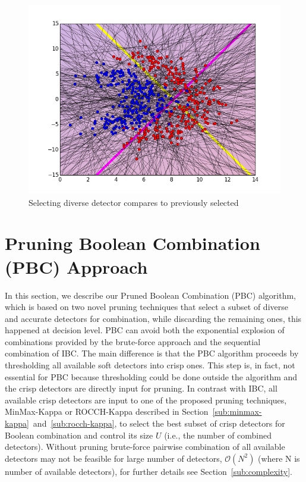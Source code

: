 \begin{figure}[H]
\centering
\includegraphics[width=1\linewidth]{figs/Lithuanian/complement_detectors}
\caption{Selecting diverse detector compares to previously selected}
\label{fig::diverse_detector}
\end{figure}


\section{Pruning Boolean Combination (PBC) Approach}
\label{sec:pbc}

In this section, we describe our Pruned Boolean Combination (PBC) algorithm, which is based on two novel pruning techniques that select a subset of diverse and accurate detectors for combination, while discarding the remaining ones, this happened at decision level.
PBC can avoid both the exponential explosion of combinations provided by the brute-force approach and the sequential combination of IBC.
The main difference is that the PBC algorithm proceeds by thresholding all available soft detectors into crisp ones.
This step is, in fact, not essential for PBC because thresholding could be done outside the algorithm and the crisp detectors are directly input for pruning.
In contrast with IBC, all available crisp detectors are input to one of the proposed pruning techniques, MinMax-Kappa or ROCCH-Kappa described in Section~\ref{sub:minmax-kappa}~and~\ref{sub:rocch-kappa}, to select the best subset of crisp detectors for Boolean combination and control its size $U$ (i.e., the number of combined detectors).
Without pruning brute-force pairwise combination of all available detectors may not be feasible for large number of detectors, $\mathcal{O}({N^2})$ (where N is number of available detectors), for further details see Section~\ref{sub:complexity}.
 
